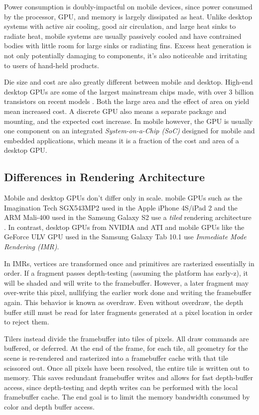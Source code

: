 Power consumption is doubly-impactful on mobile devices, since power consumed
by the processor, GPU, and memory is largely dissipated as heat.  Unlike
desktop systems with active air cooling, good air circulation, and large heat
sinks to radiate heat, mobile systems are usually passively cooled and have
contrained bodies with little room for large sinks or radiating fins.  Excess
heat generation is not only potentially damaging to components, it's also
noticeable and irritating to users of hand-held products.

Die size and cost are also greatly different between mobile and desktop.
High-end desktop GPUs are some of the largest mainstream chips made, with over
3 billion transistors on recent models \cite{Walton10}.  Both the large area
and the effect of area on yield mean increased cost.  A discrete GPU also
means a separate package and mounting, and the expected cost increase.  In
mobile however, the GPU is usually one component on an integrated
\textit{System-on-a-Chip (SoC)} designed for mobile and embedded applications,
which means it is a fraction of the cost and area of a desktop GPU.

\subsection{Differences in Rendering Architecture}
\label{Jon-McCaffrey:differences-in-rendering-architecture}
  Mobile and desktop GPUs don't
differ only in scale.  mobile GPUs such as the Imagination Tech SGX543MP2 used
in the Apple iPhone 4S/iPad 2 and the ARM Mali-400 used in the Samsung Galaxy S2
use a \textit{tiled} rendering architecture \cite{Klug11a}.  In
contrast, desktop GPUs from NVIDIA and ATI and mobile GPUs like the
GeForce ULV GPU used in the Samsung Galaxy Tab 10.1 use \textit{Immediate Mode
Rendering (IMR)}.

In IMRs, vertices are transformed once and primitives are rasterized
essentially in order.  If a fragment passes depth-testing (assuming the
platform has early-z), it will be shaded and will write to the framebuffer.
However, a later fragment may over-write this pixel, nullifying the earlier
work done and writing the framebuffer again.  This behavior is known as overdraw.
Even without overdraw, the depth buffer still must be read for later fragments 
generated at a pixel location in order to reject them.

Tilers instead divide the framebuffer into tiles of pixels.  All draw commands
are buffered, or deferred.  At the end of the frame, for each tile, all
geometry for the scene is re-rendered and rasterized into a framebuffer cache
with that tile scissored out.  Once all pixels have been resolved, the entire
tile is written out to memory.  This saves redundant framebuffer writes and
allows for fast depth-buffer access, since depth-testing and depth writes can
be performed with the local framebuffer cache.  The end goal is to limit the
memory bandwidth consumed by color and depth buffer access.

